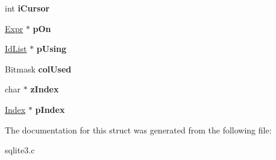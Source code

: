 \begin{DoxyCompactItemize}
\item 
\hypertarget{struct_src_list_1_1_src_list__item_af2e8aae90bd7a00b814db5a2d31f6607}{int {\bfseries i\-Cursor}}\label{struct_src_list_1_1_src_list__item_af2e8aae90bd7a00b814db5a2d31f6607}

\item 
\hypertarget{struct_src_list_1_1_src_list__item_a525f683af2ffa8f094d941a5a4972720}{\hyperlink{struct_expr}{Expr} $\ast$ {\bfseries p\-On}}\label{struct_src_list_1_1_src_list__item_a525f683af2ffa8f094d941a5a4972720}

\item 
\hypertarget{struct_src_list_1_1_src_list__item_a38ecf205dcaebad098b73c56e48ba944}{\hyperlink{struct_id_list}{Id\-List} $\ast$ {\bfseries p\-Using}}\label{struct_src_list_1_1_src_list__item_a38ecf205dcaebad098b73c56e48ba944}

\item 
\hypertarget{struct_src_list_1_1_src_list__item_a4fd7e7e26995048b58006d020e8c48d6}{Bitmask {\bfseries col\-Used}}\label{struct_src_list_1_1_src_list__item_a4fd7e7e26995048b58006d020e8c48d6}

\item 
\hypertarget{struct_src_list_1_1_src_list__item_a72b8e117712e49607b770a462fb42d95}{char $\ast$ {\bfseries z\-Index}}\label{struct_src_list_1_1_src_list__item_a72b8e117712e49607b770a462fb42d95}

\item 
\hypertarget{struct_src_list_1_1_src_list__item_ab4722e97bd4852c8b84e620185955c28}{\hyperlink{struct_index}{Index} $\ast$ {\bfseries p\-Index}}\label{struct_src_list_1_1_src_list__item_ab4722e97bd4852c8b84e620185955c28}

\end{DoxyCompactItemize}


The documentation for this struct was generated from the following file\-:\begin{DoxyCompactItemize}
\item 
sqlite3.\-c\end{DoxyCompactItemize}
